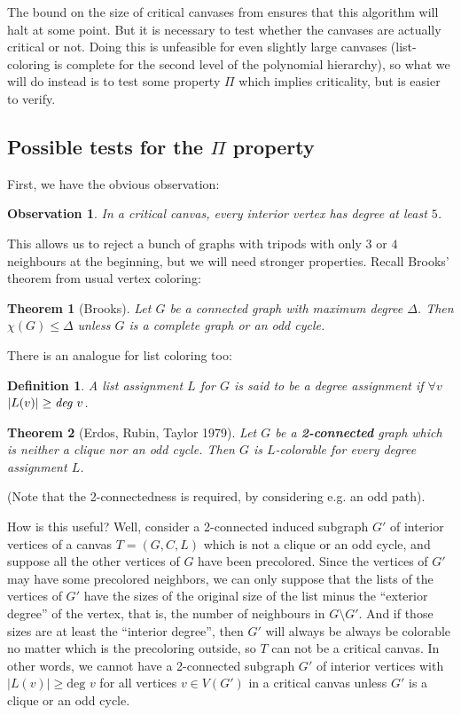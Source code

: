 \documentclass{article}
\newtheorem{theorem}{Theorem}
\newtheorem{observation}{Observation}
\newtheorem{definition}{Definition}
\begin{document}
The bound on the size of critical canvases from \cite{fivelistcoloring2} ensures that this algorithm will halt at some point. But it is necessary to test whether the canvases are actually critical or not. Doing this is unfeasible for even slightly large canvases (list-coloring is complete for the second level of the polynomial hierarchy), so what we will do instead is to test some property $\Pi$ which implies criticality, but is easier to verify. 

\subsection{Possible tests for the $\Pi$ property}

First, we have the obvious observation:

\begin{observation}
	In a critical canvas, every interior vertex has degree at least $5$.
\end{observation}

This allows us to reject a bunch of graphs with tripods with only $3$ or $4$ neighbours at the beginning, but we will need stronger properties. Recall Brooks' theorem from usual vertex coloring:

\begin{theorem}[Brooks]
Let $G$ be a connected graph with maximum degree $\Delta$. Then $\chi(G) \leq \Delta$ unless $G$ is a complete graph or an odd cycle.
\end{theorem} 

There is an analogue for list coloring too:

\begin{definition}
A list assignment $L$ for $G$ is said to be a \emph{degree assignment} if $\forall v$  $|L(v)| \geq \emph{deg } v$.
\end{definition}

\begin{theorem}[Erdos, Rubin, Taylor 1979]
Let $G$ be a \textbf{2-connected} graph which is neither a clique nor an odd cycle. Then $G$ is $L$-colorable for every degree assignment $L$.
\end{theorem}

(Note that the 2-connectedness is required, by considering e.g. an odd path). 

How is this useful? Well, consider a 2-connected induced subgraph $G'$ of interior vertices of a canvas $T = (G, C, L)$ which is not a clique or an odd cycle, and suppose all the other vertices of $G$ have been precolored. Since the vertices of $G'$ may have some precolored neighbors, we can only suppose that the lists of the vertices of $G'$ have the sizes of the original size of the list minus the ``exterior degree'' of the vertex, that is, the number of neighbours in $G \setminus G'$. And if those sizes are at least the ``interior degree'', then $G'$ will always be always be colorable no matter which is the precoloring outside, so $T$ can not be a critical canvas. In other words, we cannot have a 2-connected subgraph $G'$ of interior vertices with $|L(v)| \geq \text{deg } v$ for all vertices $v \in V(G')$ in a critical canvas unless $G'$ is a clique or an odd cycle. 
\end{document}

